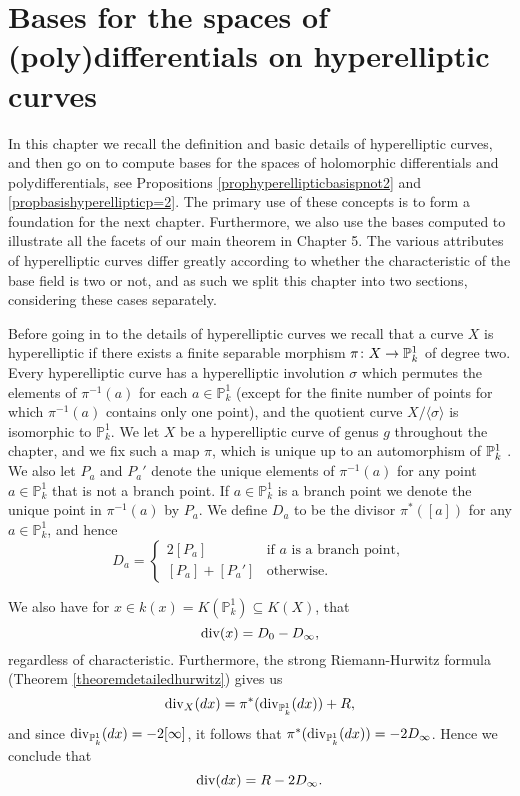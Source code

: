 \chapter{Bases for the spaces of (poly)differentials on hyperelliptic curves}\label{chapterhyperellipticcurves}


In this chapter we recall the definition and basic details of hyperelliptic curves, and then go on to compute bases for the spaces of holomorphic differentials and polydifferentials, see Propositions \ref{prophyperellipticbasispnot2} and \ref{propbasishyperellipticp=2}.
The primary use of these concepts is to form a foundation for the next chapter.
Furthermore, we also use the bases computed to illustrate all the facets of our main theorem in Chapter 5.
The various attributes of hyperelliptic curves differ greatly according to whether the characteristic of the base field is two or not, and as such we split this chapter into two sections, considering these cases separately.


Before going in to the details of hyperelliptic curves we recall that a curve $X$ is hyperelliptic if there exists a finite separable morphism $\pi \colon X \rightarrow {\mathbb P}_k^1$ of degree two.
Every hyperelliptic curve has a hyperelliptic involution $\sigma$ which permutes the elements of $\pi^{-1}(a)$ for each $a \in \mathbb P_k^1$ (except for the finite number of points for which $\pi^{-1}(a)$ contains only one point), and the quotient curve $X /\langle \sigma \rangle$ is isomorphic to $\mathbb P_k^1$.
We let $X$ be a hyperelliptic curve of genus $g$ throughout the chapter, and we fix such a map $\pi$, which is unique up to an automorphism of ${\mathbb P}_k^1$ \cite[Prop.\ 7.4.29]{liu}.
We also let $P_a$ and $P_a'$ denote the unique elements of $\pi^{-1}(a)$ for any point $a \in \mathbb P_k^1$ that is not a branch point.
If $a \in \mathbb P_k^1$ is a branch point we denote the unique point in $\pi^{-1}(a)$ by $P_a$.
We define $D_a$ to be the divisor $\pi^*\left([a]\right)$ for any $a \in \mathbb P_k^1$, and hence
    \begin{equation*}
    D_a= 
        \begin{cases}
         2[P_a] & \text{if $a$ is a branch point}, \\
         [P_a] + [P_a'] & \text{otherwise.}
        \end{cases}
    \end{equation*}

We also have for $x \in k(x)  = K(\mathbb P_k^1) \subseteq K(X)$, that
    \begin{equation}\label{equationdivxpis2}
    \operatorname{div} (x)  = D_0 - D_\infty,
    \end{equation}
regardless of characteristic.
Furthermore, the strong Riemann-Hurwitz formula (Theorem \ref{theoremdetailedhurwitz}) gives us
    \[
    \operatorname{div}_X (dx) = \pi^*( \operatorname{div}_{\mathbb P^1_k}(dx)) + R,
    \]
and since $\operatorname{div}_{{\mathbb P}_k^1}(dx) = -2[\infty]$, it follows that $\pi^*(\operatorname{div}_{{\mathbb P}_k^1}(dx)) = -2D_\infty$.
Hence we conclude that
    \begin{equation}\label{equationdifferentialdivisor}
    \operatorname{div}(dx) = R - 2D_\infty.
    \end{equation}


